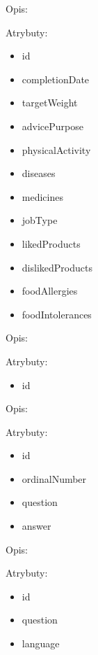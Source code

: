 \begin{enumerate}[label={\textbf{KAT/\protect\threedigits{\theenumi}}}, wide, labelwidth=!, labelindent=0pt, series=reqs]
     \label{kat:NutritionalInterview}

    Opis: \lipsum[1]
    \par
    Atrybuty:
    \begin{itemize}
        \item id
        \item completionDate
        \item targetWeight
        \item advicePurpose
        \item physicalActivity
        \item diseases
        \item medicines
        \item jobType
        \item likedProducts
        \item dislikedProducts
        \item foodAllergies
        \item foodIntolerances
    \end{itemize}

     \label{kat:OwnedKitchenAppliance}

    Opis: \lipsum[1]
    \par
    Atrybuty:
    \begin{itemize}
        \item id
    \end{itemize}

     \label{kat:CustomNutritionalInterviewQuestion}

    Opis: \lipsum[1]
    \par
    Atrybuty:
    \begin{itemize}
        \item id
        \item ordinalNumber
        \item question
        \item answer
    \end{itemize}

     \label{kat:CustomNutritionalInterviewQuestionTemplate}

    Opis: \lipsum[1]
    \par
    Atrybuty:
    \begin{itemize}
        \item id
        \item question
        \item language
    \end{itemize}


\end{enumerate}
